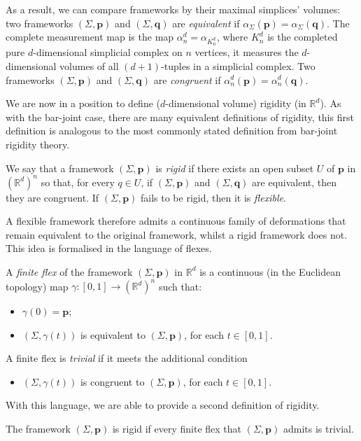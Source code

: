 \documentclass[11pt]{amsart}
\theoremstyle{definition}
\theoremstyle{remark}
\newcommand*{\defn}[1]{{\color{purple}\textit{#1}}}
\begin{document}
As a result, we can compare frameworks by their maximal simplices' volumes: two frameworks $(\Sigma,\mathbf{p})$ and $(\Sigma,\mathbf{q})$ are \defn{equivalent} if $\alpha_{\Sigma}(\mathbf{p})=\alpha_{\Sigma}(\mathbf{q})$.
The complete measurement map is the map $\alpha_n^d=\alpha_{K_n^d}$, where $K_n^d$ is the completed pure $d$-dimensional simplicial complex on $n$ vertices, it measures the $d$-dimensional volumes of all $(d+1)$-tuples in a simplicial complex.
Two frameworks $(\Sigma,\mathbf{p})$ and $(\Sigma,\mathbf{q})$ are \defn{congruent} if $\alpha_n^d(\mathbf{p})=\alpha_n^d(\mathbf{q})$.

We are now in a position to define ($d$-dimensional volume) rigidity (in $\mathbb{R}^d$).
As with the bar-joint case, there are many equivalent definitions of rigidity, this first definition is analogous to the most commonly stated definition from bar-joint rigidity theory.

We say that a framework $(\Sigma,\mathbf{p})$ is \defn{rigid} if there exists an open subset $U$ of $\mathbf{p}$ in $(\mathbb{R}^d)^n$ so that, for every $q\in U$, if $(\Sigma,\mathbf{p})$ and $(\Sigma,\mathbf{q})$ are equivalent, then they are congruent.
If $(\Sigma,\mathbf{p})$ fails to be rigid, then it is \defn{flexible}.

A flexible framework therefore admits a continuous family of deformations that remain equivalent to the original framework, whilst a rigid framework does not.
This idea is formalised in the language of flexes.

A \defn{finite flex} of the framework $(\Sigma,\mathbf{p})$ in $\mathbb{R}^d$ is a continuous (in the Euclidean topology) map $\gamma:[0,1]\rightarrow(\mathbb{R}^d)^n$ such that:
\begin{itemize}
    \item[F1]\label{item:f1} $\gamma(0)=\mathbf{p}$;
    \item[F2]\label{item:f2} $(\Sigma,\gamma(t))$ is equivalent to $(\Sigma,\mathbf{p})$, for each $t\in [0,1]$.
\end{itemize}
A finite flex is \defn{trivial} if it meets the additional condition
\begin{itemize}
    \item[F3]\label{item:f3} $(\Sigma,\gamma(t))$ is congruent to $(\Sigma,\mathbf{p})$, for each $t\in [0,1]$.
\end{itemize}
With this language, we are able to provide a second definition of rigidity.

The framework $(\Sigma,\mathbf{p})$ is rigid if every finite flex that $(\Sigma,\mathbf{p})$ admits is trivial.
\end{document}
